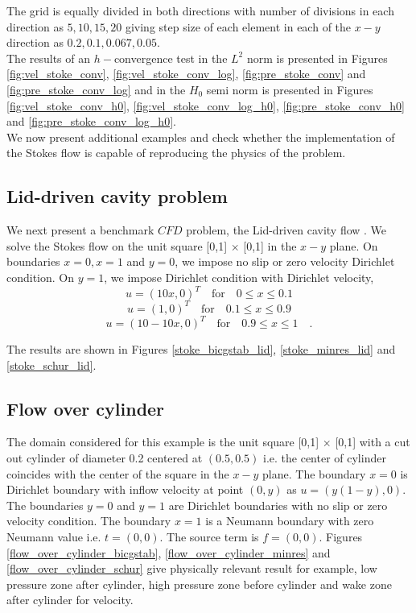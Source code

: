 \documentclass[a4paper]{book}
\begin{document}
The grid is equally divided in both directions with number of divisions in each direction as $5,10,15,20$ giving step size of each element in each of the $x-y$ direction as $0.2,0.1,0.067,0.05$.\\

The results of an $h-$convergence test in the $L^2$ norm is presented in Figures \ref{fig:vel_stoke_conv}, \ref{fig:vel_stoke_conv_log}, \ref{fig:pre_stoke_conv} and \ref{fig:pre_stoke_conv_log} and in the $H_0$ semi norm is presented in Figures \ref{fig:vel_stoke_conv_h0}, \ref{fig:vel_stoke_conv_log_h0}, \ref{fig:pre_stoke_conv_h0} and \ref{fig:pre_stoke_conv_log_h0}. \\


We now present additional examples and check whether the implementation of the Stokes flow is capable of reproducing the physics of the problem.

\subsection{Lid-driven cavity problem} \label{lid_driven_cavity_stokes}

We next present a benchmark $CFD$ problem, the Lid-driven cavity flow \cite{Montlaur2}. We solve the Stokes flow on the unit square [0,1] $\times$ [0,1] in the $x-y$ plane. On boundaries ${x = 0}, {x = 1}$ and ${y = 0}$, we impose no slip or zero velocity Dirichlet condition. On ${y = 1}$, we impose Dirichlet condition with Dirichlet velocity,
\begin{equation}
u = (10x,0)^T \quad \textrm{for} \quad 0 \leq x \leq 0.1
\end{equation}
\begin{equation}
u = (1,0)^T \quad \textrm{for} \quad 0.1 \leq x \leq 0.9
\end{equation}
\begin{equation}
u = (10 - 10x,0)^T \quad \textrm{for} \quad 0.9 \leq x \leq 1 \quad \textrm{.}
\end{equation}

The results are shown in Figures \ref{stoke_bicgstab_lid}, \ref{stoke_minres_lid} and \ref{stoke_schur_lid}.

\subsection{Flow over cylinder} \label{flow_over_cylinder_stokes}

The domain considered for this example is the unit square [0,1] $\times$ [0,1] with a cut out cylinder of diameter 0.2 centered at $(0.5,0.5)$ i.e. the center of cylinder coincides with the center of the square in the $x-y$ plane. The boundary ${x=0}$ is Dirichlet boundary with inflow velocity at point $(0,y)$ as $u = (y(1-y), 0)$. The boundaries ${y = 0}$ and ${y = 1}$ are Dirichlet boundaries with no slip or zero velocity condition. The boundary ${x = 1}$ is a Neumann boundary with zero Neumann value i.e. $t = (0, 0)$. The source term is $f = (0, 0)$. Figures \ref{flow_over_cylinder_bicgstab}, \ref{flow_over_cylinder_minres} and \ref{flow_over_cylinder_schur} give physically relevant result for example, low pressure zone after cylinder, high pressure zone before cylinder and wake zone after cylinder for velocity.
\end{document}
